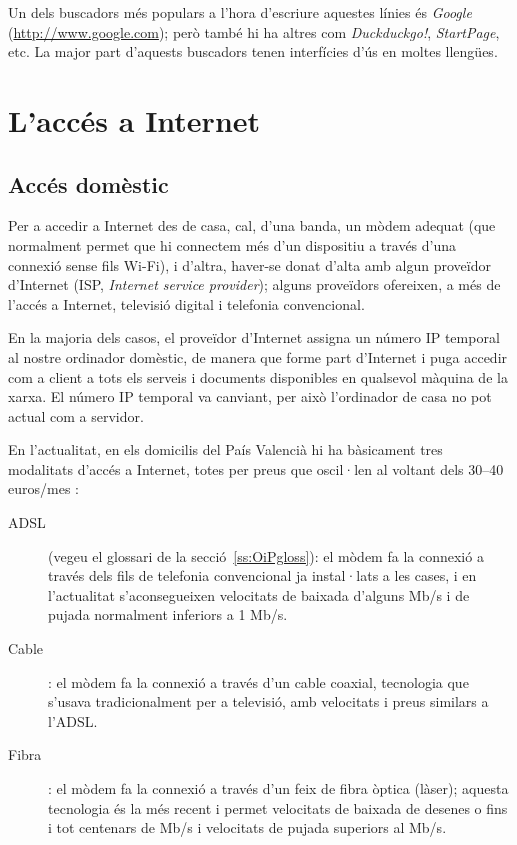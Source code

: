 Un dels buscadors més populars a l'hora d'escriure aquestes línies és
\emph{Google} (\url{http://www.google.com}); però també hi ha altres
com \emph{Duckduckgo!}, \emph{StartPage}, etc. La major part d'aquests
buscadors tenen interfícies d'ús en moltes llengües.


\section{L'accés a Internet}
\label{ss:adaI}

\subsection{Accés domèstic}
Per a accedir a Internet des de casa, cal, d'una banda, un mòdem
adequat (que normalment permet que hi connectem més d'un dispositiu a
través d'una connexió sense fils Wi-Fi), i d'altra, haver-se donat
d'alta amb algun proveïdor d'Internet (ISP, \emph{Internet service
  provider}); alguns proveïdors ofereixen, a més de l'accés a
Internet, televisió digital i telefonia convencional.

En la majoria dels casos, el proveïdor d'Internet assigna un número IP
temporal al nostre ordinador domèstic, de manera que forme part
d'Internet i puga accedir com a client a tots els serveis i documents
disponibles en qualsevol màquina de la xarxa. El número IP temporal va
canviant, per això l'ordinador de casa no pot actual com a servidor.

En l'actualitat, en els domicilis del País Valencià hi ha bàsicament
tres modalitats d'accés a Internet, totes per preus que oscil·len al
voltant dels 30--40 euros/mes :
\begin{description}
\item[ADSL] (vegeu el glossari de la secció~\ref{ss:OiPgloss}): el
  mòdem fa la connexió a través dels fils de telefonia convencional ja
  instal·lats a les cases, i en l'actualitat s'aconsegueixen
  velocitats de baixada d'alguns Mb/s i de pujada normalment inferiors
  a 1 Mb/s.
\item[Cable]: el mòdem fa la connexió a través d'un cable coaxial,
  tecnologia que s'usava tradicionalment per a televisió, amb
  velocitats i preus similars a l'ADSL.
\item[Fibra]: el mòdem fa la connexió a través d'un feix de fibra
  òptica (làser); aquesta tecnologia és la més recent i permet
  velocitats de baixada de desenes o fins i tot centenars de Mb/s i
  velocitats de pujada superiors al Mb/s.
\end{description}

